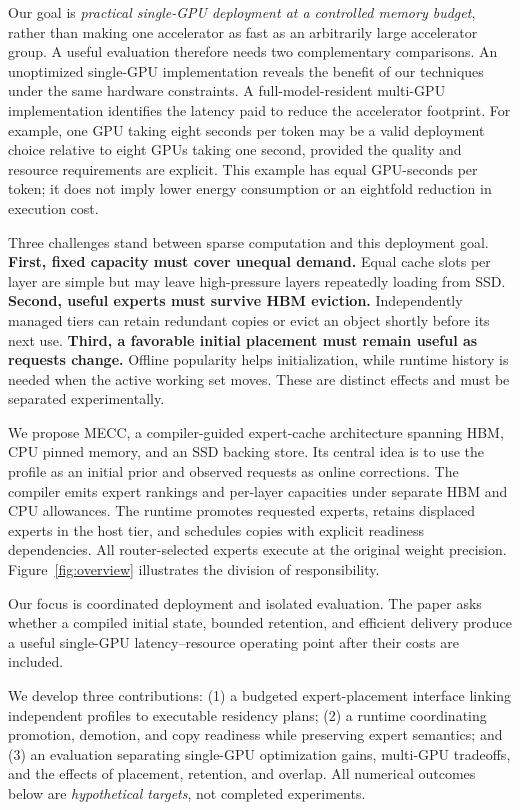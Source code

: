 \documentclass[conference,9pt,letterpaper]{IEEEtran}
\newcommand{\mecc}{\textsc{MECC}}
\begin{document}
Our goal is \emph{practical single-GPU deployment at a controlled memory budget}, rather than making one accelerator as fast as an arbitrarily large accelerator group. A useful evaluation therefore needs two complementary comparisons. An unoptimized single-GPU implementation reveals the benefit of our techniques under the same hardware constraints. A full-model-resident multi-GPU implementation identifies the latency paid to reduce the accelerator footprint. For example, one GPU taking eight seconds per token may be a valid deployment choice relative to eight GPUs taking one second, provided the quality and resource requirements are explicit. This example has equal GPU-seconds per token; it does not imply lower energy consumption or an eightfold reduction in execution cost.

Three challenges stand between sparse computation and this deployment goal. \textbf{First, fixed capacity must cover unequal demand.} Equal cache slots per layer are simple but may leave high-pressure layers repeatedly loading from SSD. \textbf{Second, useful experts must survive HBM eviction.} Independently managed tiers can retain redundant copies or evict an object shortly before its next use. \textbf{Third, a favorable initial placement must remain useful as requests change.} Offline popularity helps initialization, while runtime history is needed when the active working set moves. These are distinct effects and must be separated experimentally.

We propose \mecc{}, a compiler-guided expert-cache architecture spanning HBM, CPU pinned memory, and an SSD backing store. Its central idea is to use the profile as an initial prior and observed requests as online corrections. The compiler emits expert rankings and per-layer capacities under separate HBM and CPU allowances. The runtime promotes requested experts, retains displaced experts in the host tier, and schedules copies with explicit readiness dependencies. All router-selected experts execute at the original weight precision. Figure~\ref{fig:overview} illustrates the division of responsibility.

Our focus is coordinated deployment and isolated evaluation. The paper asks whether a compiled initial state, bounded retention, and efficient delivery produce a useful single-GPU latency--resource operating point after their costs are included.

We develop three contributions: (1) a budgeted expert-placement interface linking independent profiles to executable residency plans; (2) a runtime coordinating promotion, demotion, and copy readiness while preserving expert semantics; and (3) an evaluation separating single-GPU optimization gains, multi-GPU tradeoffs, and the effects of placement, retention, and overlap. All numerical outcomes below are \emph{hypothetical targets}, not completed experiments.
\end{document}
